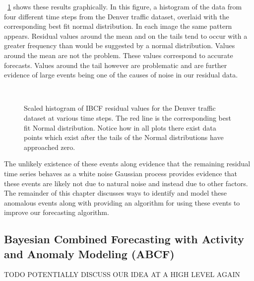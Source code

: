 ~\ref{fig:denver_bcf_residual} shows these results graphically.  In this figure, a histogram of the data from four different time steps from the Denver traffic dataset, overlaid with the corresponding best fit normal distribution.  In each image the same pattern appears.  Residual values around the mean and on the tails tend to occur with a greater frequency than would be suggested by a normal distribution.  Values around the mean are not the problem.  These values correspond to accurate forecasts.  Values around the tail however are problematic and are further evidence of large events being one of the causes of noise in our residual data.

\begin{figure}[!t]
	\begin{center}
		 \\
	\end{center}
	\caption{Scaled histogram of IBCF residual values for the Denver traffic dataset at various time steps.  The red line is the corresponding best fit Normal distribution.  Notice how in all plots there exist data points which exist after the tails of the Normal distributions have approached zero.}
	\label{fig:denver_bcf_residual}
\end{figure}

The unlikely existence of these events along evidence that the remaining residual time series behaves as a white noise Gaussian process provides evidence that these events are likely not due to natural noise and instead due to other factors.  The remainder of this chapter discusses ways to identify and model these anomalous events along with providing an algorithm for using these events to improve our forecasting algorithm.


\subsection{Bayesian Combined Forecasting with Activity and Anomaly Modeling (ABCF)}
TODO POTENTIALLY DISCUSS OUR IDEA AT A HIGH LEVEL AGAIN


